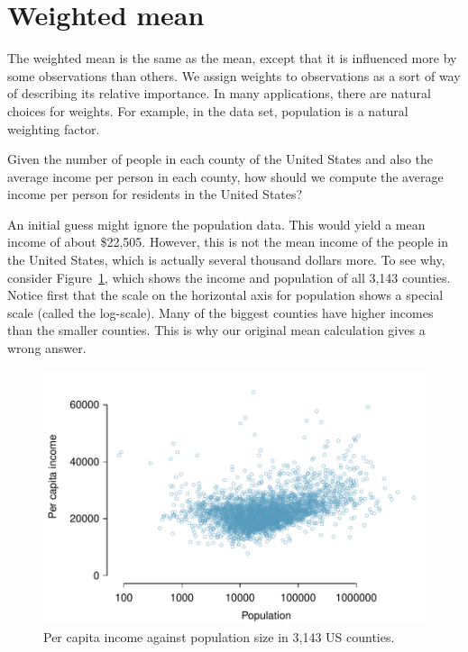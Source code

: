 
\section*{Weighted mean}

The weighted mean is the same as the mean, except that it is influenced more by some observations than others. We assign weights to observations as a sort of way of describing its relative importance. In many applications, there are natural choices for weights. For example, in the  data set, population is a natural weighting factor.

Given the number of people in each county of the United States and also the average income per person in each county, how should we compute the average income per person for residents in the United States?

An initial guess might ignore the population data. This would yield a mean income of about \$22,505. However, this is not the mean income of the people in the United States, which is actually several thousand dollars more. To see why, consider Figure~\ref{incomeVsPop}, which shows the income and population of all 3,143 counties. Notice first that the scale on the horizontal axis for population shows a special scale (called the log-scale). Many of the biggest counties have higher incomes than the smaller counties. This is why our original mean calculation gives a wrong answer.
\begin{figure}
\centering
\includegraphics[width=\textwidth]{WeightedMean/figures/incomeVsPop/incomeVsPop} 
\caption{Per capita income against population size in 3,143 US counties.}
\label{incomeVsPop}
\end{figure}


